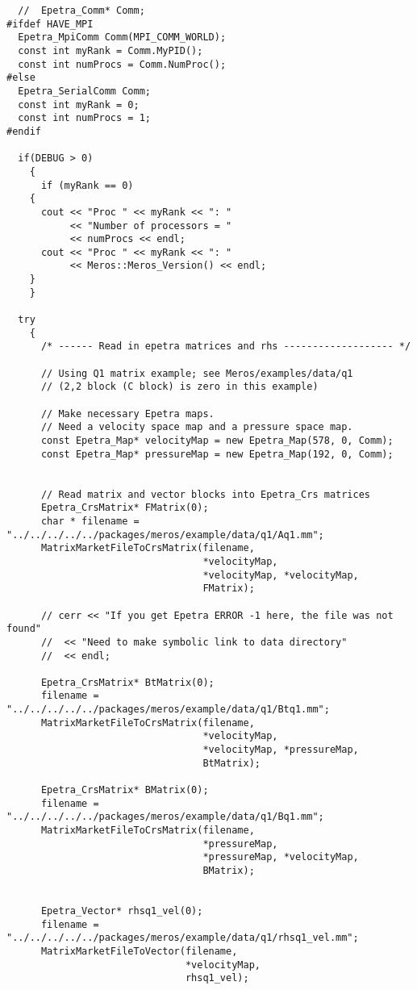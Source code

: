 \begin{verbatim}
  //  Epetra_Comm* Comm;
#ifdef HAVE_MPI
  Epetra_MpiComm Comm(MPI_COMM_WORLD);
  const int myRank = Comm.MyPID();
  const int numProcs = Comm.NumProc();
#else
  Epetra_SerialComm Comm;
  const int myRank = 0;
  const int numProcs = 1;
#endif

  if(DEBUG > 0)
    {
      if (myRank == 0)
	{
	  cout << "Proc " << myRank << ": " 
	       << "Number of processors = " 
	       << numProcs << endl;
	  cout << "Proc " << myRank << ": " 
	       << Meros::Meros_Version() << endl;
	}
    }
  
  try
    {
      /* ------ Read in epetra matrices and rhs ------------------- */

      // Using Q1 matrix example; see Meros/examples/data/q1
      // (2,2 block (C block) is zero in this example)
  
      // Make necessary Epetra maps.
      // Need a velocity space map and a pressure space map.
      const Epetra_Map* velocityMap = new Epetra_Map(578, 0, Comm); 
      const Epetra_Map* pressureMap = new Epetra_Map(192, 0, Comm); 
 

      // Read matrix and vector blocks into Epetra_Crs matrices
      Epetra_CrsMatrix* FMatrix(0);
      char * filename = "../../../../../packages/meros/example/data/q1/Aq1.mm";
      MatrixMarketFileToCrsMatrix(filename,
                                  *velocityMap,
                                  *velocityMap, *velocityMap,
                                  FMatrix);

      // cerr << "If you get Epetra ERROR -1 here, the file was not found"
      //  << "Need to make symbolic link to data directory" 
      //  << endl;

      Epetra_CrsMatrix* BtMatrix(0);
      filename = "../../../../../packages/meros/example/data/q1/Btq1.mm";
      MatrixMarketFileToCrsMatrix(filename,
                                  *velocityMap, 
                                  *velocityMap, *pressureMap,
                                  BtMatrix);

      Epetra_CrsMatrix* BMatrix(0);
      filename = "../../../../../packages/meros/example/data/q1/Bq1.mm";
      MatrixMarketFileToCrsMatrix(filename,
                                  *pressureMap,
                                  *pressureMap, *velocityMap,
                                  BMatrix);


      Epetra_Vector* rhsq1_vel(0);
      filename = "../../../../../packages/meros/example/data/q1/rhsq1_vel.mm";
      MatrixMarketFileToVector(filename,
                               *velocityMap, 
                               rhsq1_vel);


\end{verbatim}
